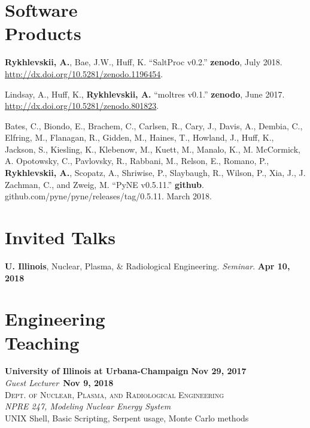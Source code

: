 \documentclass[margin,line]{resume}
\begin{document}
\begin{resume}
\section{\mysidestyle Software\\Products}
\begin{bibenum}
	\item \textbf{Rykhlevskii, A.}, Bae, J.W., Huff, K. ``SaltProc v0.2.'' 
	\textbf{zenodo}, July 2018.
	\url{http://dx.doi.org/10.5281/zenodo.1196454}.
	
	\item Lindsay, A., Huff, K., \textbf{Rykhlevskii, A.} ``moltres v0.1.'' 
	\textbf{zenodo}, June 2017. \url{http://dx.doi.org/10.5281/zenodo.801823}.
	
	\item Bates, C., Biondo, E., Brachem, C., Carlsen, R., Cary, J., Davis, 
	A., Dembia, C., Elfring, M., Flanagan, R., Gidden, M., Haines, T., 
	Howland, J., Huff, K., Jackson, S., Kiesling, K., Klebenow, M., Kuett, M., 
	Manalo, K., M. McCormick, A. Opotowsky, C., Pavlovsky, R., Rabbani, M., 
	Relson, E., Romano, P., \textbf{Rykhlevskii, A.}, Scopatz, A., Shriwise, 
	P., Slaybaugh, R., Wilson, P., Xia, J., J. Zachman, C., and Zweig, M. 
	``PyNE v0.5.11.'' \textbf{github}. 
	github.com/pyne/pyne/releases/tag/0.5.11. March 2018. 
\end{bibenum}
    \section{\mysidestyle Invited Talks}
      \textbf{U. Illinois}, Nuclear, Plasma, \& Radiological Engineering. \emph{Seminar}.  \hfill\textbf{Apr 10, 2018}\\
    \section{\mysidestyle Engineering\\Teaching}
    \textbf{University of Illinois at Urbana-Champaign} \hfill \textbf{Nov 29, 2017}\\
    \textsl{Guest Lecturer}~\hfill \textbf{Nov 9, 2018}\\
    \textsc{Dept. of Nuclear, Plasma, and Radiological Engineering}\\ 
               \textsl{NPRE 247, Modeling Nuclear Energy System}\\
               UNIX Shell, Basic Scripting, Serpent usage, Monte Carlo methods
               \vspace{2mm}

\end{resume}
\end{document}
